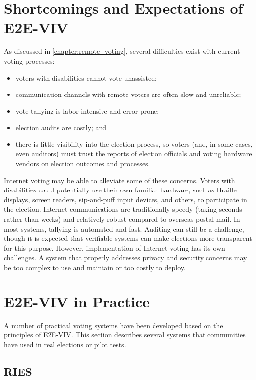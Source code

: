 \section{Shortcomings and Expectations of E2E-VIV}

As discussed in \autoref{chapter:remote_voting}, several difficulties
exist with current voting processes:

\begin{itemize}
\item voters with disabilities cannot vote unassisted; 
\item communication channels with remote voters are often slow and
  unreliable;
\item vote tallying is labor-intensive and error-prone; 
\item election audits are costly; and
\item there is little visibility into the election process, so voters
  (and, in some cases, even auditors) must trust the reports of
  election officials and voting hardware vendors on election outcomes
  and processes.
\end{itemize}

Internet voting may be able to alleviate some of these
concerns. Voters with disabilities could potentially use their own
familiar hardware, such as Braille displays, screen readers,
sip-and-puff input devices, and others, to participate in the
election. Internet communications are traditionally speedy (taking
seconds rather than weeks) and relatively robust compared to overseas
postal mail. In most systems, tallying is automated and fast. Auditing
can still be a challenge, though it is expected that verifiable
systems can make elections more transparent for this purpose. However,
implementation of Internet voting has its own challenges. A system
that properly addresses privacy and security concerns may be too
complex to use and maintain or too costly to deploy.

\section{E2E-VIV in Practice}

A number of practical voting systems have been developed based on the
principles of E2E-VIV. This section describes several systems that
communities have used in real elections or pilot tests.

\subsection{RIES}
\label{sec:ries} 

